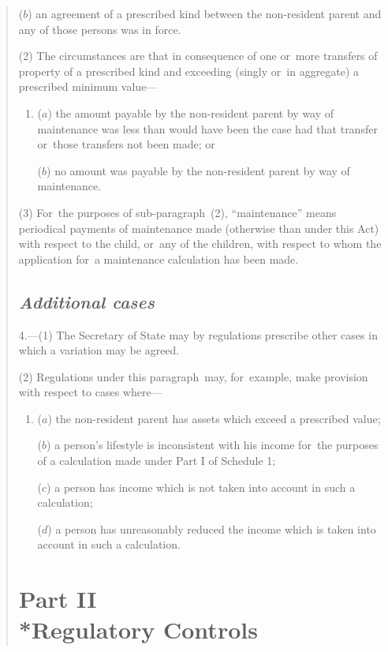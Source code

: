 \documentclass[12pt,a4paper]{article}
\begin{document}
\begin{quotation}
\begin{enumerate}
($b$) an agreement of a prescribed kind between the non-resident parent and any of those persons was in force.
\end{enumerate}

(2) The circumstances are that in consequence of one or~more transfers of property of a prescribed kind and exceeding (singly or~in aggregate) a prescribed minimum value—
\begin{enumerate}\item[]
($a$) the amount payable by the non-resident parent by way of maintenance was less than would have been the case had that transfer or~those transfers not been made; or

($b$) no amount was payable by the non-resident parent by way of maintenance.
\end{enumerate}

(3) For~the purposes of sub-paragraph~(2), “maintenance” means periodical payments of maintenance made (otherwise than under this Act) with respect to the child, or~any of the children, with respect to whom the application for~a maintenance calculation has been made.

\subsection*{\itshape Additional cases}

4.---(1) The Secretary of State may by regulations prescribe other cases in which a variation may be agreed.

(2) Regulations under this paragraph~may, for~example, make provision with respect to cases where—
\begin{enumerate}\item[]
($a$) the non-resident parent has assets which exceed a prescribed value;

($b$) a person’s lifestyle is inconsistent with his income for~the purposes of a calculation made under Part I of Schedule 1;

($c$) a person has income which is not taken into account in such a calculation;

($d$) a person has unreasonably reduced the income which is taken into account in such a calculation.
\end{enumerate}

\vfill

\section*{Part II\\*Regulatory Controls}


\end{quotation}
\end{document}
